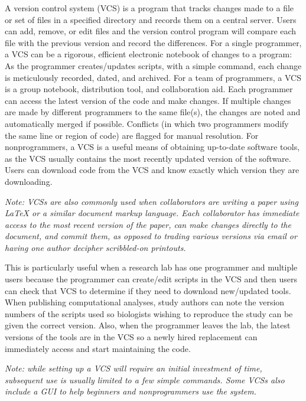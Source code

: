 \documentclass[ChapterTOCs,krantz2]{krantz} %
\begin{document}
A version control system
(VCS) is a program that tracks changes made to a file or set of files in a specified
directory and records them on a central server. Users can add, remove,
or edit files and the version control program will compare each file
with the previous version and record the differences. For a single programmer,
a VCS can be a rigorous, efficient electronic notebook of changes to a program:  As the programmer
creates/updates scripts, with a simple command, each change is meticulously
recorded, dated, and archived.  For a team of programmers, a VCS
is a group notebook, distribution tool, and collaboration aid.  Each programmer can access the
latest version of the code and make changes.  If multiple changes are made by
different programmers to the same file(s), the changes are noted and automatically
merged if possible. Conflicts (in which two
programmers modify the same line or region of code) are flagged for manual resolution.  
For nonprogrammers, a VCS is a
useful means of obtaining up-to-date software tools, as the VCS usually contains the most 
recently updated version of the software.  Users can download code
from the VCS and know exactly which version they are downloading.

\textsl{Note: VCSs are also commonly used when collaborators are writing 
a paper using LaTeX or a similar document markup language.  Each collaborator 
has immediate access to the most recent version of the paper, can make 
changes directly to the document, and commit them, as opposed 
to trading various versions via email or having one author decipher scribbled-on 
printouts.}

This is particularly useful when a research lab has one programmer 
and multiple users because the programmer can create/edit scripts in
the VCS and then users can check that VCS to determine if they need to
download new/updated tools.  When publishing 
computational analyses, study
authors can note the version numbers of the scripts used so biologists
wishing to reproduce the study can be given the correct version.
Also, when the programmer leaves the lab, the latest versions of the
tools are in the VCS so a newly hired replacement can immediately
access and start maintaining the code.

\textsl{Note: while setting up a VCS will require an initial investment of time, 
subsequent use is usually limited to a few simple commands.  Some VCSs
also include a GUI to help beginners and nonprogrammers use the system.}
\end{document}
